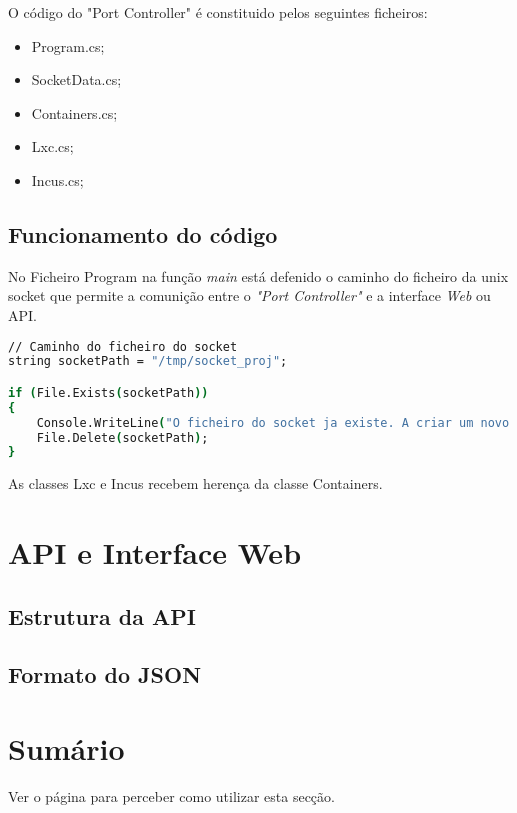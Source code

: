 O código do "Port Controller" é constituido pelos seguintes ficheiros:

\begin{itemize}
    \item Program.cs;
    \item SocketData.cs;
    \item Containers.cs;
    \item Lxc.cs;
    \item Incus.cs;
\end{itemize}

\subsection{Funcionamento do código}


No Ficheiro Program na função \textit{main} está defenido o caminho do ficheiro 
da unix socket que permite a comunição entre o \textit{"Port Controller"} e 
a interface \textit{Web} ou API.


\begin{lstlisting}[language=csh, caption={teste}]
// Caminho do ficheiro do socket
string socketPath = "/tmp/socket_proj";

if (File.Exists(socketPath))
{
    Console.WriteLine("O ficheiro do socket ja existe. A criar um novo...");
    File.Delete(socketPath);
}

\end{lstlisting}




As classes Lxc e Incus recebem herença da classe Containers.


\section{API e Interface Web}

\subsection{Estrutura da API}

\subsection{Formato do JSON}


\section*{Sumário}

Ver o  página \pageref{sec:intro_summary} para perceber como utilizar esta secção.


